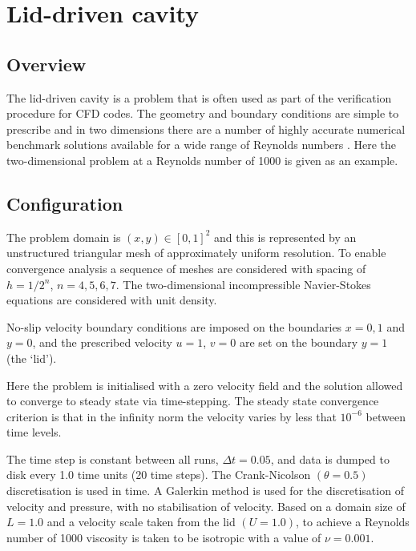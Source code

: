 
\section{Lid-driven cavity}
\label{sect:lid_driven_cavity}

\subsection{Overview}
The lid-driven cavity is a problem that is often used as part of the verification procedure for
CFD codes. The geometry and boundary conditions are simple to prescribe and in
two dimensions there are a number of highly accurate numerical benchmark solutions
available for a wide range of Reynolds numbers \citep{botella1998,erturk2005,bruneau2006}. 
Here the two-dimensional problem at a Reynolds number of 1000 is given as an example.

\subsection{Configuration}
The problem domain is $(x,y) \in [0,1]^2$ and this is represented by an unstructured triangular mesh
of approximately uniform resolution. To enable convergence analysis a sequence of meshes are considered
with spacing of $h=1/2^n$, $n=4,5,6,7$. The two-dimensional incompressible Navier-Stokes equations are
considered with unit density.

No-slip velocity boundary conditions are imposed on the boundaries $x=0,1$ and $y=0$, 
and the prescribed velocity $u=1$, $v=0$ are set on the boundary $y=1$ (the `lid'). 

Here the problem is initialised with a zero velocity field and the solution
allowed to converge to steady state via time-stepping. The steady state convergence criterion is
that in the infinity norm the velocity varies by less that $10^{-6}$ between time levels.

The time step is constant between all runs, $\Delta t = 0.05$, and data is dumped to disk every
1.0 time units (20 time steps). The Crank-Nicolson $(\theta=0.5)$ discretisation is used in time. 
A \Poo Galerkin method is used for the discretisation of velocity and pressure, with no stabilisation
of velocity. Based on a domain size of $L=1.0$ and a velocity scale taken from the lid $(U=1.0)$, to achieve
a Reynolds number of 1000 viscosity is taken to be isotropic with a value of $\nu=0.001$.

